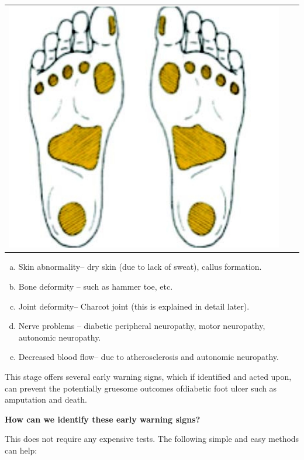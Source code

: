 \begin{center}
\begin{tabular}{@{}ccc@{}}
\includegraphics[scale=.8]{images/062.jpg}
\end{tabular}
\end{center}

\begin{enumerate}[a.]
\itemsep=0pt
\item Skin abnormality– dry skin (due to lack of sweat), callus formation.
\item Bone deformity – such as hammer toe, etc.
\item Joint deformity– Charcot joint (this is explained in detail later).
\item Nerve problems – diabetic peripheral neuropathy, motor neuropathy, autonomic neuro\-pathy.
\item Decreased blood flow– due to atherosclerosis and autonomic neuro\-pathy.
\end{enumerate}

This stage offers several early warning signs, which if identified and acted upon, can prevent the potentially gruesome outcomes of\break diabetic foot ulcer such as amputation and death.

\noindent\textbf{How can we identify these early warning signs?}

This does not require any expensive tests. The following simple and easy methods can help:

